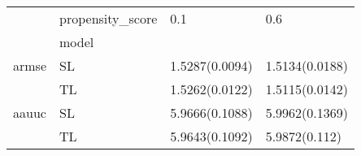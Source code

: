 \begin{tabular}{llll}
\toprule
      & propensity\_score &             0.1 &             0.6 \\
{} & model &                 &                 \\
\midrule
armse & SL &  1.5287(0.0094) &  1.5134(0.0188) \\
      & TL &  1.5262(0.0122) &  1.5115(0.0142) \\
aauuc & SL &  5.9666(0.1088) &  5.9962(0.1369) \\
      & TL &  5.9643(0.1092) &   5.9872(0.112) \\
\bottomrule
\end{tabular}
